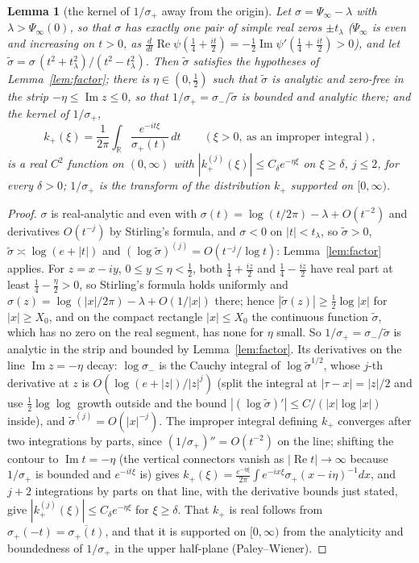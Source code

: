 \documentclass[11pt]{article}
\newtheorem{lemma}[theorem]{Lemma}
\theoremstyle{definition}
\theoremstyle{remark}
\newcommand{\R}{\mathbb{R}}
\DeclareMathOperator{\Ree}{Re}
\DeclareMathOperator{\Imm}{Im}
\begin{document}
\begin{lemma}[the kernel of $1/\sigma_+$ away from the origin]\label{lem:kernel}
Let $\sigma=\Psi_\infty-\lambda$ with $\lambda>\Psi_\infty(0)$, so that $\sigma$ has exactly one pair of simple real zeros $\pm t_\lambda$ ($\Psi_\infty$ is even and increasing on $t>0$, as $\frac d{dt}\Ree\psi(\frac14+\frac{it}2)=-\frac12\Imm\psi'(\frac14+\frac{it}2)>0$), and let $\tilde\sigma=\sigma\,(t^2+t_\lambda^2)/(t^2-t_\lambda^2)$. Then $\tilde\sigma$ satisfies the hypotheses of Lemma~\ref{lem:factor}; there is $\eta\in(0,\frac12)$ such that $\tilde\sigma$ is analytic and zero-free in the strip $-\eta\le\Imm z\le0$, so that $1/\sigma_+=\sigma_-/\tilde\sigma$ is bounded and analytic there; and the kernel of $1/\sigma_+$,
\[
k_+(\xi)=\frac1{2\pi}\int_\R\frac{e^{-it\xi}}{\sigma_+(t)}\,dt\qquad(\xi>0,\ \text{as an improper integral}),
\]
is a real $C^2$ function on $(0,\infty)$ with $|k_+^{(j)}(\xi)|\le C_\delta e^{-\eta\xi}$ on $\xi\ge\delta$, $j\le2$, for every $\delta>0$; $1/\sigma_+$ is the transform of the distribution $k_+$ supported on $[0,\infty)$.
\end{lemma}
\begin{proof}
$\sigma$ is real-analytic and even with $\sigma(t)=\log(t/2\pi)-\lambda+O(t^{-2})$ and derivatives $O(t^{-j})$ by Stirling's formula, and $\sigma<0$ on $|t|<t_\lambda$, so $\tilde\sigma>0$, $\tilde\sigma\asymp\log(e+|t|)$ and $(\log\tilde\sigma)^{(j)}=O(t^{-j}/\log t)$: Lemma~\ref{lem:factor} applies. For $z=x-iy$, $0\le y\le\eta<\frac12$, both $\frac14+\frac{iz}2$ and $\frac14-\frac{iz}2$ have real part at least $\frac14-\frac\eta2>0$, so Stirling's formula holds uniformly and $\sigma(z)=\log(|x|/2\pi)-\lambda+O(1/|x|)$ there; hence $|\tilde\sigma(z)|\ge\frac12\log|x|$ for $|x|\ge X_0$, and on the compact rectangle $|x|\le X_0$ the continuous function $\tilde\sigma$, which has no zero on the real segment, has none for $\eta$ small. So $1/\sigma_+=\sigma_-/\tilde\sigma$ is analytic in the strip and bounded by Lemma~\ref{lem:factor}. Its derivatives on the line $\Imm z=-\eta$ decay: $\log\sigma_-$ is the Cauchy integral of $\log\tilde\sigma^{1/2}$, whose $j$-th derivative at $z$ is $O(\log(e+|z|)/|z|^j)$ (split the integral at $|\tau-x|=|z|/2$ and use $\frac12\log\log$ growth outside and the bound $|(\log\tilde\sigma)'|\le C/(|x|\log|x|)$ inside), and $\tilde\sigma^{(j)}=O(|x|^{-j})$. The improper integral defining $k_+$ converges after two integrations by parts, since $(1/\sigma_+)''=O(t^{-2})$ on the line; shifting the contour to $\Imm t=-\eta$ (the vertical connectors vanish as $|\Ree t|\to\infty$ because $1/\sigma_+$ is bounded and $e^{-it\xi}$ is) gives $k_+(\xi)=\frac{e^{-\eta\xi}}{2\pi}\int e^{-ix\xi}\sigma_+(x-i\eta)^{-1}dx$, and $j+2$ integrations by parts on that line, with the derivative bounds just stated, give $|k_+^{(j)}(\xi)|\le C_\delta e^{-\eta\xi}$ for $\xi\ge\delta$. That $k_+$ is real follows from $\sigma_+(-t)=\overline{\sigma_+(t)}$, and that it is supported on $[0,\infty)$ from the analyticity and boundedness of $1/\sigma_+$ in the upper half-plane (Paley--Wiener).
\end{proof}
\end{document}
